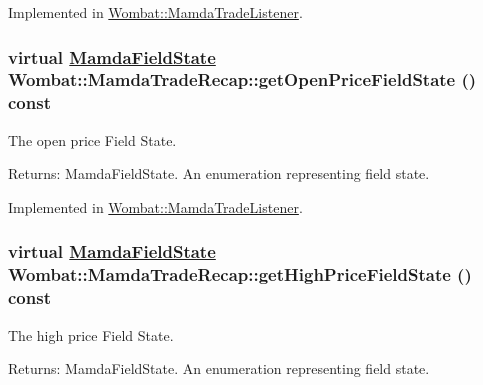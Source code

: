 Implemented in \hyperlink{classWombat_1_1MamdaTradeListener_0662220b81bda7b4fe9532ff4c15f3c8}{Wombat::Mamda\-Trade\-Listener}.\hypertarget{classWombat_1_1MamdaTradeRecap_aa06d51b6f953dbef06a4d59a8438ec1}{
\subsubsection[getOpenPriceFieldState]{\setlength{\rightskip}{0pt plus 5cm}virtual \hyperlink{namespaceWombat_93aac974f2ab713554fd12a1fa3b7d2a}{Mamda\-Field\-State} Wombat::Mamda\-Trade\-Recap::get\-Open\-Price\-Field\-State () const}}
\label{classWombat_1_1MamdaTradeRecap_aa06d51b6f953dbef06a4d59a8438ec1}


The open price Field State. 

\begin{Desc}
\item[Returns:]Mamda\-Field\-State. An enumeration representing field state. \end{Desc}


Implemented in \hyperlink{classWombat_1_1MamdaTradeListener_823d3caa4ea0c0c6efb7c6f0e7e2a59e}{Wombat::Mamda\-Trade\-Listener}.\hypertarget{classWombat_1_1MamdaTradeRecap_a96180881510aca5fb838905052fffa5}{
\subsubsection[getHighPriceFieldState]{\setlength{\rightskip}{0pt plus 5cm}virtual \hyperlink{namespaceWombat_93aac974f2ab713554fd12a1fa3b7d2a}{Mamda\-Field\-State} Wombat::Mamda\-Trade\-Recap::get\-High\-Price\-Field\-State () const}}
\label{classWombat_1_1MamdaTradeRecap_a96180881510aca5fb838905052fffa5}


The high price Field State. 

\begin{Desc}
\item[Returns:]Mamda\-Field\-State. An enumeration representing field state. \end{Desc}


